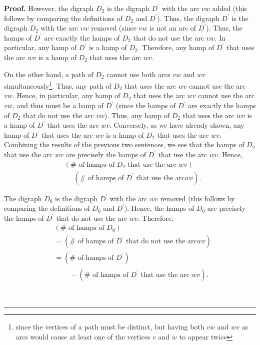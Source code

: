 \documentclass[numbers=enddot,12pt,final,onecolumn,notitlepage]{scrartcl}%
\numberwithin{exer}{subsection}
\theoremstyle{definition}
\newenvironment{proof}[1][Proof]{\noindent\textbf{#1.} }{\ \rule{0.5em}{0.5em}}
\begin{document}
\begin{proof}
However, the digraph $D_{2}$ is the digraph $D^{\prime}$ with the arc $vw$
added (this follows by comparing the definitions of $D_{2}$ and $D^{\prime}$).
Thus, the digraph $D^{\prime}$ is the digraph $D_{2}$ with the arc $vw$
removed (since $vw$ is not an arc of $D^{\prime}$). Thus, the hamps of
$D^{\prime}$ are exactly the hamps of $D_{2}$ that do not use the arc $vw$. In
particular, any hamp of $D^{\prime}$ is a hamp of $D_{2}$. Therefore, any hamp
of $D^{\prime}$ that uses the arc $wv$ is a hamp of $D_{2}$ that uses the arc
$wv$.

On the other hand, a path of $D_{2}$ cannot use both arcs $vw$ and $wv$
simultaneously\footnote{since the vertices of a path must be distinct, but
having both $vw$ and $wv$ as arcs would cause at least one of the vertices $v$
and $w$ to appear twice}. Thus, any path of $D_{2}$ that uses the arc $wv$
cannot use the arc $vw$. Hence, in particular, any hamp of $D_{2}$ that uses
the arc $wv$ cannot use the arc $vw$, and thus must be a hamp of $D^{\prime}$
(since the hamps of $D^{\prime}$ are exactly the hamps of $D_{2}$ that do not
use the arc $vw$). Thus, any hamp of $D_{2}$ that uses the arc $wv$ is a hamp
of $D^{\prime}$ that uses the arc $wv$. Conversely, as we have already shown,
any hamp of $D^{\prime}$ that uses the arc $wv$ is a hamp of $D_{2}$ that uses
the arc $wv$. Combining the results of the previous two sentences, we see that
the hamps of $D_{2}$ that use the arc $wv$ are precisely the hamps of
$D^{\prime}$ that use the arc $wv$. Hence,%
\begin{align}
&  \left(  \#\text{ of hamps of }D_{2}\text{ that use the arc }wv\right)
\nonumber\\
&  =\left(  \#\text{ of hamps of }D^{\prime}\text{ that use the arc
}wv\right)  . \label{pf.lem.tourn.reverse.eq2}%
\end{align}


The digraph $D_{0}$ is the digraph $D^{\prime}$ with the arc $wv$ removed
(this follows by comparing the definitions of $D_{0}$ and $D^{\prime}$).
Hence, the hamps of $D_{0}$ are precisely the hamps of $D^{\prime}$ that do
not use the arc $wv$. Therefore,%
\begin{align}
&  \left(  \#\text{ of hamps of }D_{0}\right) \nonumber\\
&  =\left(  \#\text{ of hamps of }D^{\prime}\text{ that do not use the arc
}wv\right) \nonumber\\
&  =\left(  \#\text{ of hamps of }D^{\prime}\right) \nonumber\\
&  \ \ \ \ \ \ \ \ \ \ -\left(  \#\text{ of hamps of }D^{\prime}\text{ that
use the arc }wv\right)  . \label{pf.lem.tourn.reverse.eq3}%
\end{align}



\end{proof}
\end{document}
